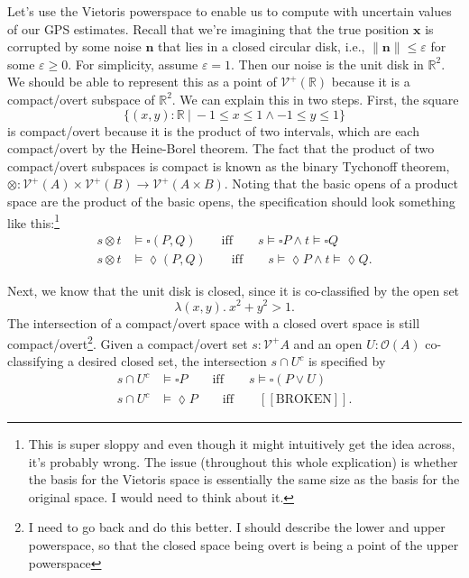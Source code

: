 \documentclass{article}           %
\newcommand{\R}{\mathbb{R}}
\newcommand{\fun}[2]{\lambda {#1}.\  {#2}}
\newcommand{\suchthat}{\ |\ }
\newcommand{\Open}[1]{\mathcal{O}({#1})}
\newcommand{\Viet}{{\mathcal{V}^+}}
\newcommand{\ve}[1]{\mathbf{#1}}
\begin{document}
Let's use the Vietoris powerspace to enable us to compute with uncertain values of our GPS estimates. Recall that we're imagining that the true position $\ve{x}$ is corrupted by some noise $\ve{n}$ that lies in a closed circular disk, i.e., $\| \ve{n} \| \le \varepsilon$ for some $\varepsilon \ge 0$. For simplicity, assume $\varepsilon = 1$. Then our noise is the unit disk in $\R^2$. We should be able to represent this as a point of $\Viet(\R)$ because it is a compact/overt subspace of $\R^2$. We can explain this in two steps. First, the square 
\[
\{ (x, y) : \R \suchthat -1 \le x \le 1 \wedge -1 \le y \le 1 \}
\]
is compact/overt because it is the product of two intervals, which are each compact/overt by the Heine-Borel theorem. The fact that the product of two compact/overt subspaces is compact is known as the binary Tychonoff theorem, $\otimes : \Viet(A) \times \Viet(B) \to \Viet(A \times B)$. Noting that the basic opens of a product space are the product of the basic opens, the specification should look something like this:\footnote{This is super sloppy and even though it might intuitively get the idea across, it's probably wrong. The issue (throughout this whole explication) is whether the basis for the Vietoris space is essentially the same size as the basis for the original space. I would need to think about it.}
\begin{align*}
s \otimes t &\models \square (P, Q) \qquad \text{iff} \qquad s \models \square P \wedge t \models \square Q
\\ s \otimes t &\models \lozenge (P, Q) \qquad \text{iff} \qquad s \models \lozenge P \wedge t \models \lozenge Q.
\end{align*}

Next, we know that the unit disk is closed, since it is co-classified by the open set
\[
\fun{(x,y)}{x^2 + y^2 > 1}.
\]
The intersection of a compact/overt space with a closed overt space is still compact/overt\footnote{I need to go back and do this better. I should describe the lower and upper powerspace, so that the closed space being overt is being a point of the upper powerspace}. Given a compact/overt set $s : \Viet{A}$ and an open $U : \Open{A}$ co-classifying a desired closed set, the intersection $s \cap U^c$ is specified by
\begin{align*}
s \cap U^c &\models \square P \qquad \text{iff} \qquad s \models \square (P \vee U)
\\ s \cap U^c &\models \lozenge P \qquad \text{iff} \qquad [[\text{BROKEN}]].
\end{align*}
\end{document}
